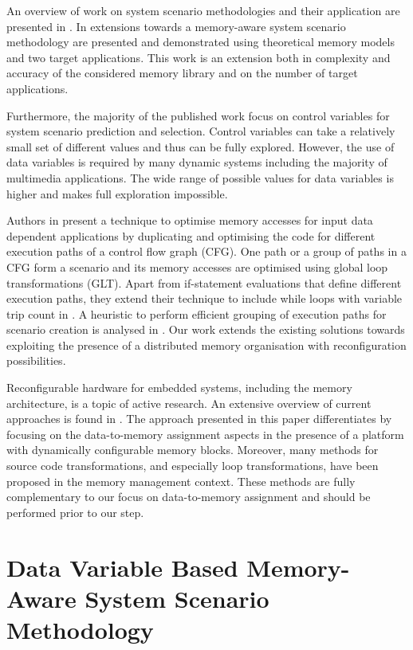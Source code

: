 \documentclass[smallextended]{svjour3}
\begin{document}
An overview of work on system scenario methodologies and their application are presented in \cite{Gheorghita2007}. 
In \cite{Fil12} extensions towards a memory-aware system scenario methodology are presented and demonstrated using theoretical memory models and two target applications. 
This work is an extension both in complexity and accuracy of the considered memory library and on the number of target applications. 

Furthermore, the majority of the published work focus on control variables for system scenario prediction and selection. 
Control variables can take a relatively small set of different values and thus can be fully explored. However, the use of data variables \cite{Elena2010} is required by many dynamic systems including the majority of multimedia applications. 
The wide range of possible values for data variables is higher and makes full exploration impossible. 

Authors in \cite{Pal06} present a technique to optimise memory accesses for input data dependent applications by duplicating and optimising the code for different execution paths of a control flow graph (CFG). 
One path or a group of paths in a CFG form a scenario and its memory accesses are optimised using global loop transformations (GLT). 
Apart from if-statement evaluations that define different execution paths, they extend their technique to include while loops with variable trip count in \cite{Pal06b}. 
A heuristic to perform efficient grouping of execution paths for scenario creation is analysed in \cite{Pal07}. 
Our work extends the existing solutions towards exploiting the presence of a distributed memory organisation with reconfiguration possibilities.

Reconfigurable hardware for embedded systems, including the memory architecture, is a topic of active research. 
An extensive overview of current approaches is found in \cite{Garcia}. 
The approach presented in this paper differentiates by focusing on the data-to-memory assignment aspects in the presence of a platform with dynamically configurable memory blocks. 
Moreover, many methods for source code transformations, and especially loop transformations, have been proposed in the memory management context. 
These methods are fully complementary to our focus on data-to-memory assignment and should be performed prior to our step. 

\section{Data Variable Based Memory-Aware System Scenario Methodology}
\label{sec:methodology}
\end{document}
